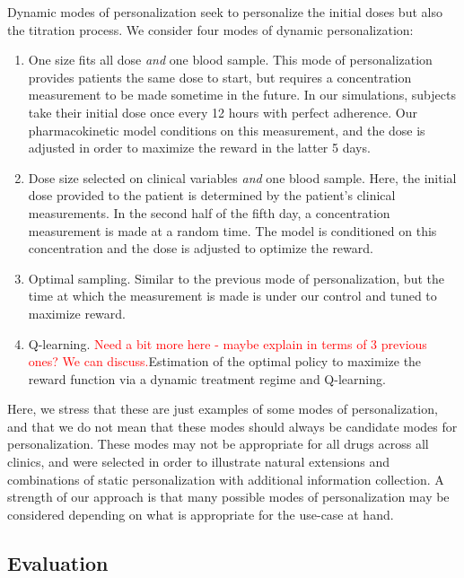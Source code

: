 Dynamic modes of personalization seek to personalize the initial doses but also the titration process.  We consider four modes of dynamic personalization:

\begin{enumerate}
	\item One size fits all dose \textit{and} one blood sample.  This mode of personalization provides patients the same dose to start, but requires a concentration measurement to be made sometime in the future.  In our simulations, subjects take their initial dose once every 12 hours with perfect adherence.  Our pharmacokinetic model conditions on this measurement, and the dose is adjusted in order to maximize the reward in the latter 5 days.
	
	\item Dose size selected on clinical variables \textit{and} one blood sample.  Here, the initial dose provided to the patient is determined by the patient's clinical measurements. In the second half of the fifth day, a concentration measurement is made at a random time. The model is conditioned on this concentration and the dose is adjusted to optimize the reward.
	
	\item Optimal sampling.  Similar to the previous mode of personalization, but the time at which the measurement is made is under our control and tuned to maximize reward.
	
	\item Q-learning. \textcolor{red}{Need a bit more here - maybe explain in terms of 3 previous ones? We can discuss.}Estimation of the optimal policy to maximize the reward function via a dynamic treatment regime and Q-learning.
\end{enumerate}

Here, we stress that these are just examples of some modes of personalization, and that we do not mean that these modes should always be candidate modes for personalization.  These modes may not be appropriate for all drugs across all clinics, and were selected in order to illustrate natural extensions and combinations of static personalization with additional information collection. A strength of our approach is that many possible modes of personalization may be considered depending on what is appropriate for the use-case at hand.

\subsection{Evaluation}

